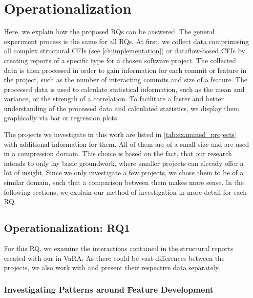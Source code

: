 \section{Operationalization}\label{sec:operationalization}

Here, we explain how the proposed RQs can be answered.
The general experiment process is the same for all RQs.
At first, we collect data comprimising all complex structural CFIs (see \autoref{ch:implementation}) or dataflow-based CFIs by creating reports of a specific type for a chosen software project.
The collected data is then processed in order to gain information for each commit or feature in the project, such as the number of interacting commits and size of a feature.
The processed data is used to calculate statistical information, such as the mean and variance, or the strength of a correlation.
To facilitate a faster and better understanding of the processed data and calculated statistics, we display them graphically via bar or regression plots.

The projects we investigate in this work are listed in \autoref{tab:examined_projects} with additional information for them.
All of them are of a small size and are used in a compression domain.
This choice is based on the fact, that our research intends to only lay basic groundwork, where smaller projects can already offer a lot of insight.
Since we only investigate a few projects, we chose them to be of a similar domain, such that a comparison between them makes more sense.
In the following sections, we explain our method of investigation in more detail for each RQ.

\subsection[RQ1]{Operationalization: RQ1}\label{sec:op:RQ1}

For this RQ, we examine the interactions contained in the structural reports created with our  in VaRA.
As there could be vast differences between the projects, we also work with and present their respective data separately.

\subsubsection*{Investigating Patterns around Feature Development}

